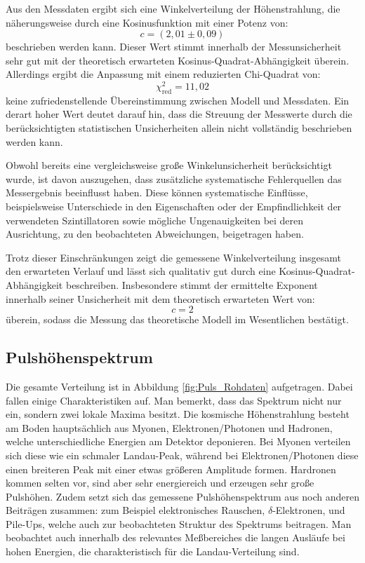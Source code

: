 Aus den Messdaten ergibt sich eine Winkelverteilung der Höhenstrahlung, die näherungsweise durch eine Kosinusfunktion mit einer Potenz von:
\[
c = (2{,}01 \pm 0{,}09)
\]
beschrieben werden kann. Dieser Wert stimmt innerhalb der Messunsicherheit sehr gut mit der theoretisch erwarteten Kosinus-Quadrat-Abhängigkeit überein. Allerdings ergibt die Anpassung mit einem reduzierten Chi-Quadrat von:
\[
\chi^2_\mathrm{red} = 11{,}02
\]
keine zufriedenstellende Übereinstimmung zwischen Modell und Messdaten. Ein derart hoher Wert deutet darauf hin, dass die Streuung der Messwerte durch die berücksichtigten statistischen Unsicherheiten allein nicht vollständig beschrieben werden kann.

Obwohl bereits eine vergleichsweise große Winkelunsicherheit berücksichtigt wurde, ist davon auszugehen, dass zusätzliche systematische Fehlerquellen das Messergebnis beeinflusst haben. Diese können systematische Einflüsse, beispielsweise Unterschiede in den Eigenschaften oder der Empfindlichkeit der verwendeten Szintillatoren sowie mögliche Ungenauigkeiten bei deren Ausrichtung, zu den beobachteten Abweichungen, beigetragen haben.

Trotz dieser Einschränkungen zeigt die gemessene Winkelverteilung insgesamt den erwarteten Verlauf und lässt sich qualitativ gut durch eine Kosinus-Quadrat-Abhängigkeit beschreiben. Insbesondere stimmt der ermittelte Exponent innerhalb seiner Unsicherheit mit dem theoretisch erwarteten Wert von:
\[
c = 2
\]
überein, sodass die Messung das theoretische Modell im Wesentlichen bestätigt.

\subsection{Pulshöhenspektrum}
Die gesamte Verteilung ist in Abbildung \ref{fig:Puls_Rohdaten} aufgetragen. Dabei fallen einige Charakteristiken auf.
Man bemerkt, dass das Spektrum  nicht nur ein, sondern zwei lokale Maxima besitzt. Die kosmische Höhenstrahlung besteht am Boden hauptsächlich aus Myonen, Elektronen/Photonen und Hadronen, welche unterschiedliche Energien am Detektor deponieren. Bei Myonen verteilen sich diese wie ein schmaler Landau-Peak, während bei Elektronen/Photonen diese einen breiteren Peak mit einer etwas größeren Amplitude formen. Hardronen kommen selten vor, sind aber sehr energiereich und erzeugen sehr große Pulshöhen.
Zudem setzt sich das gemessene Pulshöhenspektrum aus noch anderen Beiträgen zusammen: zum Beispiel elektronisches Rauschen, $\delta$-Elektronen, und Pile-Ups, welche auch zur beobachteten Struktur des Spektrums beitragen.
Man beobachtet auch innerhalb des relevantes Meßbereiches die langen Ausläufe bei hohen Energien, die charakteristisch für die Landau-Verteilung sind.  

